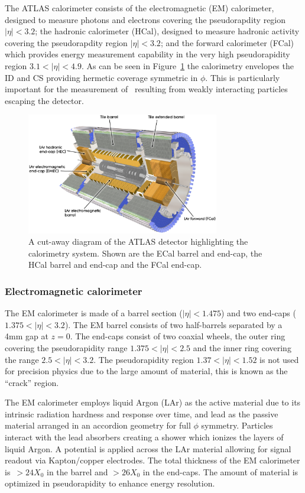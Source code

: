 The ATLAS calorimeter consists of the electromagnetic (EM) calorimeter, designed to measure photons and electrons covering the pseudorapdity region $|\eta|<3.2$; the hadronic calorimeter (HCal), designed to measure hadronic activity covering the pseudorapdity region $|\eta|<3.2$; and the forward calorimeter (FCal) which provides energy measurement capability in the very high pseudorapidity region $3.1<|\eta|<4.9$. As can be seen in Figure~\ref{fig:ATLASCalorimetryOverall} the calorimetry envelopes the ID and CS providing hermetic coverage symmetric in $\phi$. This is particularly important for the measurement of \met\ resulting from weakly interacting particles escaping the detector.

\begin{figure}[htbp]
  \centering
  \includegraphics[width=0.75\textwidth]{PartDetector/Diagrams/ATLAS_Calorimetry.eps}
  \caption{A cut-away diagram of the ATLAS detector highlighting the calorimetry system. Shown are the ECal barrel and end-cap, the HCal barrel and end-cap and the FCal end-cap.}
  \label{fig:ATLASCalorimetryOverall}
\end{figure}

\subsubsection{Electromagnetic calorimeter}
The EM calorimeter is made of a barrel section ($|\eta|<1.475$) and two end-caps ($1.375<|\eta|<3.2$). The EM barrel consists of two half-barrels separated by a 4mm gap at $z=0$. The end-caps consist of two coaxial wheels, the outer ring covering the pseudorapidity range $1.375<|\eta|<2.5$ and the inner ring covering the range $2.5<|\eta|<3.2$. The pseudorapidity region $1.37<|\eta|<1.52$ is not used for precision physics due to the large amount of material, this is known as the ``crack'' region.

The EM calorimeter employs liquid Argon (LAr) as the active material due to its intrinsic radiation hardness and response over time, and lead as the passive material arranged in an accordion geometry for full $\phi$ symmetry. Particles interact with the lead absorbers creating a shower which ionizes the layers of liquid Argon. A potential is applied across the LAr material allowing for signal readout via Kapton/copper electrodes. The total thickness of the EM calorimeter is~$>24X_{0}$ in the barrel and $>26X_{0}$ in the end-caps. The amount of material is optimized in pseudorapidity to enhance energy resolution.

